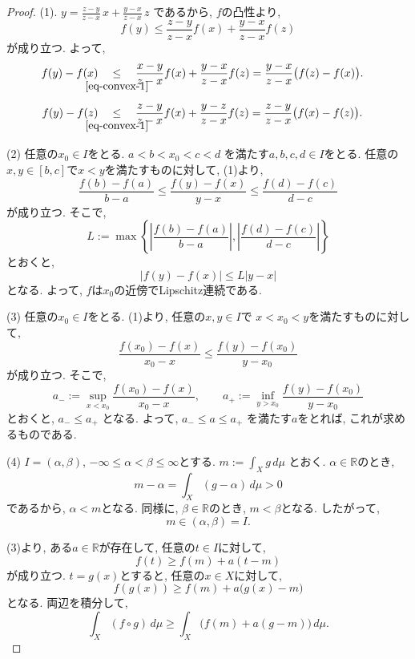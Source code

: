 \documentclass[dvipdfmx,a4paper,11pt]{report} %
\theoremstyle{definition}
\theoremstyle{remark}
\numberwithin{equation}{section}
\newcommand{\underalign}[2]{\quad \underset{\mathclap{\strut #1}}{#2}\quad}
\newcommand{\R}{\mathbb{R}}
\begin{document}
\begin{proof}
(1).
\(
y
=
\frac{z-y}{z-x}\,x
+
\frac{y-x}{z-x}\,z
\)
であるから, $f$の凸性より,
\begin{equation}
\label{eq-convex-1}
f(y)
\leq
\frac{z-y}{z-x}f(x)
+
\frac{y-x}{z-x}f(z)
\end{equation}
が成り立つ.
よって,
\[
\begin{aligned}
f(y)-f(x)
&\underalign{\eqref{eq-convex-1}}{\leq}
\frac{x-y}{z-x}f(x)
+
\frac{y-x}{z-x}f(z)
=
\frac{y-x}{z-x}\bigl(f(z)-f(x)\bigr).
\end{aligned}
\]
\[
\begin{aligned}
f(y)-f(z)
&\underalign{\eqref{eq-convex-1}}{\leq}
\frac{z-y}{z-x}f(x)
+
\frac{y-z}{z-x}f(z)
=
\frac{z-y}{z-x}\bigl(f(x)-f(z)\bigr).
\end{aligned}
\]

(2) 任意の$x_0 \in I$をとる.
\(
a<b<x_0<c<d
\)
を満たす$a,b,c,d \in I$をとる.
任意の$x,y \in [b,c]$で$x<y$を満たすものに対して,
(1)より,
\[
\frac{f(b)-f(a)}{b-a}
\leq
\frac{f(y)-f(x)}{y-x}
\leq
\frac{f(d)-f(c)}{d-c}
\]
が成り立つ.
そこで,
\[
L:=
\max\left\{
\left|\frac{f(b)-f(a)}{b-a}\right|,
\left|\frac{f(d)-f(c)}{d-c}\right|
\right\}
\]
とおくと,
\[
|f(y)-f(x)| \leq L|y-x|
\]
となる.
よって, $f$は$x_0$の近傍でLipschitz連続である.

(3) 任意の$x_0 \in I$をとる.
(1)より, 任意の$x,y \in I$で
$x<x_0<y$を満たすものに対して,
\[
\frac{f(x_0)-f(x)}{x_0-x}
\leq
\frac{f(y)-f(x_0)}{y-x_0}
\]
が成り立つ.
そこで,
\[
a_-:=
\sup_{x<x_0}
\frac{f(x_0)-f(x)}{x_0-x},
\qquad
a_+:=
\inf_{y>x_0}
\frac{f(y)-f(x_0)}{y-x_0}
\]
とおくと,
\(
a_- \leq a_+
\)
となる.
よって,
\(
a_- \leq a \leq a_+
\)
を満たす$a$をとれば, これが求めるものである.


(4) $I=(\alpha,\beta)$,
$-\infty \leq \alpha<\beta \leq \infty$とする.
\(
m:=\int_X g\,d\mu
\)
とおく.
$\alpha \in \R$のとき,
\[
m-\alpha
=
\int_X (g-\alpha)\,d\mu
>0
\]
であるから, $\alpha<m$となる.
同様に, $\beta \in \R$のとき, $m<\beta$となる.
したがって,
\[
m \in (\alpha,\beta)=I.
\]

(3)より, ある$a \in \R$が存在して,
任意の$t \in I$に対して,
\[
f(t) \geq f(m)+a(t-m)
\]
が成り立つ.
$t=g(x)$とすると, 任意の$x \in X$に対して,
\[
f(g(x))
\geq
f(m)+a\bigl(g(x)-m\bigr)
\]
となる.
両辺を積分して,
\[
\int_X (f \circ g)\,d\mu
\geq
\int_X \bigl(f(m)+a(g-m)\bigr)\,d\mu.
\]
\end{proof}
\end{document}
